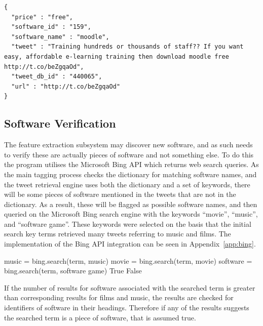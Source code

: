 \begin{lstlisting}[caption=Another example of some extracted features, label=lst:extr2]
{
  "price" : "free",
  "software_id" : "159",
  "software_name" : "moodle",
  "tweet" : "Training hundreds or thousands of staff?? If you want easy, affordable e-learning training then download moodle free http://t.co/beZgqaOd",
  "tweet_db_id" : "440065",
  "url" : "http://t.co/beZgqaOd"
}
\end{lstlisting}

\subsection{Software Verification}
\label{sec:bing}
The feature extraction subsystem may discover new software, and as such needs to verify these are actually pieces of software and not something else. To do this the program utilises the Microsoft Bing API which returns web search queries. As the main tagging process checks the dictionary for matching software names, and the tweet retrieval engine uses both the dictionary and a set of keywords, there will be some pieces of software mentioned in the tweets that are not in the dictionary. As a result, these will be flagged as possible software names, and then queried on the Microsoft Bing search engine with the keywords ``movie'', ``music'', and ``software game''. These keywords were selected on the basis that the initial search key terms retrieved many tweets referring to music and films. The implementation of the Bing API integration can be seen in Appendix~\ref{app:bing}.
\newline
\begin{algorithmic}
    \State music = bing.search(term, music)
    \State movie = bing.search(term, movie)
    \State software = bing.search(term, software game)
    \newline
            \State \Return True
        \EndIf
    \EndIf
    \newline
    \State \Return False
\EndFunction
\end{algorithmic}
If the number of results for software associated with the searched term is greater than corresponding results for films and music, the results are checked for identifiers of software in their headings. Therefore if any of the results suggests the searched term is a piece of software, that is assumed true.

